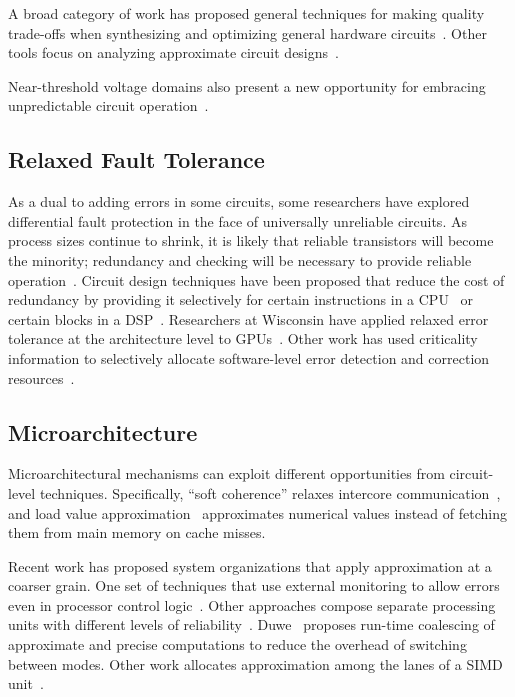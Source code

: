 A broad category of work has proposed general techniques for making quality trade-offs
when synthesizing and optimizing general hardware
circuits~\cite{lossysynthesis, palem-pruning, rahimi, axilog, miao-thesis, synthesis-date14, venkataramani-date13, venkataramani-dac12}.
Other tools focus on analyzing approximate circuit
designs~\cite{venkatesan-iccad11, tziantzioulis-dac15}.

Near-threshold voltage domains also present a new opportunity for embracing
unpredictable circuit operation~\cite{soft-ntc}.

\subsection{Relaxed Fault Tolerance}

As a dual to adding errors in some circuits, some researchers have
explored differential fault protection in the face of universally unreliable
circuits. As process sizes continue to shrink, it is likely that reliable
transistors will become the minority; redundancy and checking will be
necessary to provide reliable operation~\cite{li-asplos08}. Circuit design
techniques have been proposed that reduce the cost of redundancy by providing
it selectively for certain instructions in a CPU~\cite{wreft} or certain
blocks in a DSP~\cite{unequal-protection, ant, micropower-dsp}.
Researchers at Wisconsin have applied relaxed error tolerance at the
architecture level to GPUs~\cite{palframan-gpu}.
Other work has used criticality information to selectively allocate
software-level error detection and correction
resources~\cite{khudia-tolerance, shi-cal}.

\subsection{Microarchitecture}

Microarchitectural mechanisms can exploit different opportunities from
circuit-level techniques.
Specifically, ``soft coherence'' relaxes intercore
communication~\cite{softcoherence},
and load value approximation~\cite{lva-sanmiguel, lva-thwaites} approximates
numerical values instead of fetching them from main memory on cache misses.

Recent work has proposed system organizations that apply approximation at a
coarser grain.
One set of techniques that use external monitoring to
allow errors even in processor control logic~\cite{martonosi-date, commguard}.
Other approaches compose separate processing units with different levels of
reliability~\cite{ersa}.
Duwe~\cite{duwe-thesis} proposes run-time coalescing of approximate and
precise computations to reduce the overhead of switching between modes.
Other work allocates approximation among the lanes of a SIMD
unit~\cite{tabsh}.

